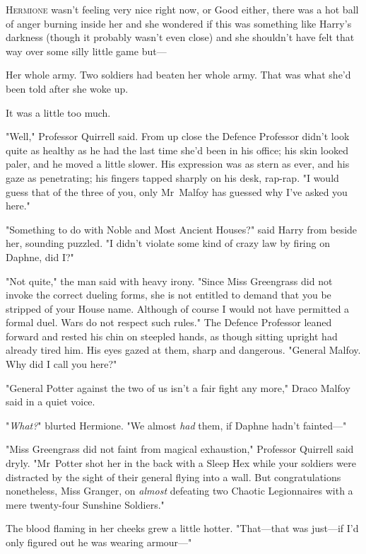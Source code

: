 
\lettrine{H}{ermione} wasn't
feeling very nice right now, or Good either, there was a hot ball of anger
burning inside her and she wondered if this was something like Harry's darkness
(though it probably wasn't even close) and she shouldn't have felt that way
over some silly little game but---

Her whole army. Two soldiers had beaten her whole army. That was what she'd
been told after she woke up.

It was a little too much.

"Well," Professor Quirrell said. From up close the Defence Professor didn't
look quite as healthy as he had the last time she'd been in his office; his
skin looked paler, and he moved a little slower. His expression was as stern as
ever, and his gaze as penetrating; his fingers tapped sharply on his desk,
rap-rap. "I would guess that of the three of you, only Mr~Malfoy has guessed
why I've asked you here."

"Something to do with Noble and Most Ancient Houses?" said Harry from beside
her, sounding puzzled. "I didn't violate some kind of crazy law by firing on
Daphne, did I?"

"Not quite," the man said with heavy irony. "Since Miss Greengrass did not
invoke the correct dueling forms, she is not entitled to demand that you be
stripped of your House name. Although of course I would not have permitted a
formal duel. Wars do not respect such rules." The Defence Professor leaned
forward and rested his chin on steepled hands, as though sitting upright had
already tired him. His eyes gazed at them, sharp and dangerous. "General
Malfoy. Why did I call you here?"

"General Potter against the two of us isn't a fair fight any more," Draco Malfoy
said in a quiet voice.

"\emph{What?}" blurted Hermione. "We almost \emph{had} them, if Daphne hadn't
fainted---"

"Miss Greengrass did not faint from magical exhaustion," Professor Quirrell
said dryly. "Mr~Potter shot her in the back with a Sleep Hex while your
soldiers were distracted by the sight of their general flying into a wall. But
congratulations nonetheless, Miss Granger, on \emph{almost} defeating two
Chaotic Legionnaires with a mere twenty-four Sunshine Soldiers."

The blood flaming in her cheeks grew a little hotter. "That---that was
just---if I'd only figured out he was wearing armour---"

